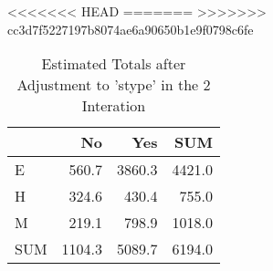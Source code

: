 <<<<<<< HEAD
=======
>>>>>>> cc3d7f5227197b8074ae6a90650b1e9f0798c6fe
\begin{table}[ht]
\centering
\caption{Estimated Totals after Adjustment to 'stype' in the 2 Interation} 
\begin{tabular}{l|rr|r}
  & No & Yes & SUM \\ 
  \hline
E & 560.7 & 3860.3 & 4421.0 \\ 
  H & 324.6 & 430.4 & 755.0 \\ 
  M & 219.1 & 798.9 & 1018.0 \\ 
   \hline
SUM & 1104.3 & 5089.7 & 6194.0 \\ 
  \end{tabular}
\end{table}
